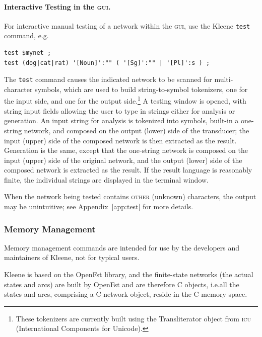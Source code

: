 \documentclass[letterpaper,12pt]{article}
\newcommand{\acro}{\textsc}
\def\CPP{{C\nolinebreak[4]\hspace{-.08em}\raisebox{.3ex}{\footnotesize\bf
+}\nolinebreak\hspace{-.1em}\raisebox{.3ex}{\footnotesize\bf +}}}
\begin{document}
\paragraph{Interactive Testing in the \acro{gui}.}

For interactive manual testing of a network within the \acro{gui},
use the Kleene \texttt{test} command, e.g.

\begin{Verbatim}[fontsize=\small]
test $mynet ;
test (dog|cat|rat) '[Noun]':"" ( '[Sg]':"" | '[Pl]':s ) ;
\end{Verbatim}

\noindent
The \texttt{test} command causes the indicated network to be scanned for
multi-character symbols, which are used to build 
string-to-symbol tokenizers, one for the input side, and one for
the output side.\footnote{These tokenizers are currently
built using the Transliterator object from \acro{icu} (International
Components for Unicode).}  A testing window is opened, with string
input fields allowing the user to type in strings either for
analysis or generation.  An input string for analysis is tokenized
into symbols, built-in a one-string network, and composed on the
output (lower) side of the transducer; the input (upper) side of
the composed network is then extracted as the result.  Generation
is the same, except that the one-string network is composed on the
input (upper) side of the original network, and the output (lower)
side of the composed network is extracted as the result.  If the
result language is reasonably finite, the individual strings are
displayed in the terminal window.

\begin{samepage}
\begin{changebar}

When the network being tested contains \acro{other} (unknown) characters,
the output may be unintuitive; see Appendix~\ref{app:test} for more
details.

\end{changebar}
\end{samepage}

\subsubsection{Memory Management}

Memory management commands are intended for use by the developers and
maintainers of Kleene, not for typical users.

Kleene is based on the OpenFst library, and the finite-state networks
(the actual states and arcs) are built by OpenFst and are therefore
\CPP{} objects, i.e.\@ all the states and arcs, comprising a \CPP{}
network object, reside in the \CPP{} memory space.
\end{document}

